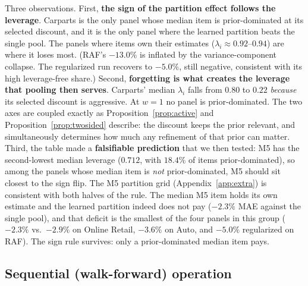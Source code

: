 \documentclass[twocolumn,10pt]{article}
\begin{document}
Three observations. First, \textbf{the sign of the partition effect
follows the leverage}. Carparts is the only panel whose median item is
prior-dominated at its selected discount, and it is the only panel where
the learned partition beats the single pool. The panels where items own
their estimates ($\lambda_i\approx0.92$--$0.94$) are where it loses
most. (RAF's $-13.0\%$ is inflated by the variance-component collapse.
The regularized run recovers to $-5.0\%$, still negative, consistent
with its high leverage-free share.) Second, \textbf{forgetting is what
creates the leverage that pooling then serves}. Carparts' median
$\lambda_i$ falls from $0.80$ to $0.22$ \emph{because} its selected
discount is aggressive. At $w{=}1$ no panel is prior-dominated. The two
axes are coupled exactly as Proposition~\ref{prop:active} and
Proposition~\ref{prop:twosided} describe: the discount keeps the prior
relevant, and simultaneously determines how much any refinement of that
prior can matter. Third, the table made a \textbf{falsifiable
prediction} that we then tested: M5 has the second-lowest median
leverage ($0.712$, with $18.4\%$ of items prior-dominated), so among the
panels whose median item is \emph{not} prior-dominated, M5 should sit
closest to the sign flip. The M5 partition grid
(Appendix~\ref{app:extra}) is consistent with both halves of the rule.
The median M5 item holds its own estimate and the learned partition
indeed does not pay ($-2.3\%$ MAE against the single pool), and that
deficit is the smallest of the four panels in this group ($-2.3\%$
vs.\ $-2.9\%$ on Online Retail, $-3.6\%$ on Auto, and $-5.0\%$
regularized on RAF). The sign rule survives: only a prior-dominated
median item pays.

\subsection{Sequential (walk-forward) operation}\label{sec:walkforward}
\end{document}

